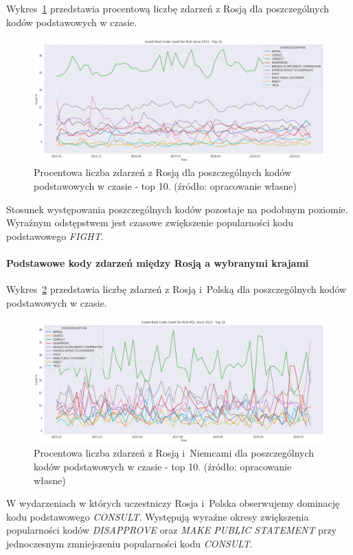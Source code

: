 \documentclass[11pt]{report}
\begin{document}
    Wykres~\ref{fig:RUSPERCpercinTIME} przedstawia procentową liczbę zdarzeń z Rosją dla poszczególnych kodów podstawowych w czasie.
    \begin{figure}[!htp]
        \centering
        \includegraphics[width=\linewidth]{fig/RUS/RUSERCpercinTIME.png}
        \caption{Procentowa liczba zdarzeń z Rosją dla poszczególnych kodów podstawowych w czasie - top 10. (źródło: opracowanie własne)}
        \label{fig:RUSPERCpercinTIME}
    \end{figure}
    Stosunek występowania poszczególnych kodów pozostaje na podobnym poziomie.
    Wyraźnym odstępstwem jest czasowe zwiększenie popularności kodu podstawowego \textit{FIGHT}.

    \paragraph{Podstawowe kody zdarzeń między Rosją a wybranymi krajami}

    Wykres~\ref{fig:RUSPOLERC} przedstawia liczbę zdarzeń z Rosją i~Polską dla poszczególnych kodów podstawowych w czasie.
    \begin{figure}[!htp]
        \centering
        \includegraphics[width=\linewidth]{fig/RUS/RUSPOLERCperc.png}
        \caption{Procentowa liczba zdarzeń z Rosją i~Niemcami dla poszczególnych kodów podstawowych w czasie - top 10. (źródło: opracowanie własne)}
        \label{fig:RUSPOLERC}
    \end{figure}
    W wydarzeniach w których uczestniczy Rosja i~Polska obserwujemy dominację kodu podstawowego \textit{CONSULT}.
    Występują wyraźne okresy zwiększenia popularności kodów \textit{DISAPPROVE} oraz \textit{MAKE PUBLIC STATEMENT} przy jednoczesnym zmniejszeniu popularności kodu \textit{CONSULT}.
\end{document}
